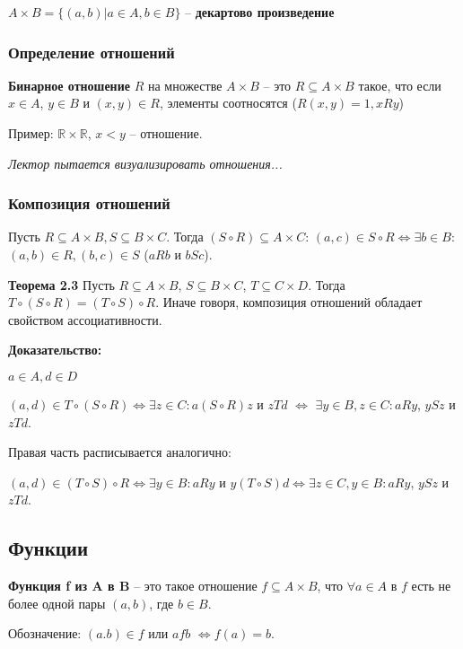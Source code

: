 \documentclass[openany]{article}
\newcommand{\R} {\mathbb{R}}
\begin{document}
   $A \times B = \{(a, b) | a \in A, b \in B\}$ -- \textbf{декартово произведение}

   \subsubsection{Определение отношений}

   \textbf{Бинарное отношение} $R$ на множестве $A \times B$ -- это $R \subseteq A \times B$ такое, что если $x \in A$, $y \in B$ и $(x, y) \in R$, элементы соотносятся ($R(x, y) = 1, xRy$)

   Пример: $\R \times \R$, $x < y$ -- отношение.

   \textit{Лектор пытается визуализировать отношения...}

   \subsubsection{Композиция отношений}

   Пусть $R \subseteq A \times B, S \subseteq B \times C$. Тогда $(S \circ R) \subseteq A \times C$: $(a, c) \in S \circ R \Leftrightarrow \exists b \in B:$ $(a, b) \in R, (b, c) \in S$ ($aRb$ и $bSc$).

   \textbf{Теорема 2.3} Пусть $R \subseteq A \times B$, $S \subseteq B \times C$, $T \subseteq C \times D$. Тогда $T \circ (S \circ R) = (T \circ S) \circ R$. Иначе говоря, композиция отношений обладает свойством ассоциативности.

   \textbf{Доказательство:}

   $a \in A, d \in D$

   $(a, d) \in T \circ (S \circ R) \Leftrightarrow \exists z \in C: a(S \circ R)z$ и $zTd$ $\Leftrightarrow$ $\exists y \in B, z \in C: aRy$, $ySz$ и $zTd$.

   Правая часть расписывается аналогично:

   $(a, d) \in (T \circ S) \circ R \Leftrightarrow \exists y \in B: aRy$ и $y(T \circ S)d \Leftrightarrow \exists z \in C, y \in B: aRy$, $ySz$ и $zTd$.

   \subsection{Функции}

   \textbf{Функция f из A в B} -- это такое отношение $f \subseteq A \times B$, что $\forall a \in A$ в $f$ есть не более одной пары $(a, b)$, где $b \in B$.

   Обозначение: $(a. b) \in f$ или $afb$ $\Leftrightarrow f(a) = b$.
\end{document}
